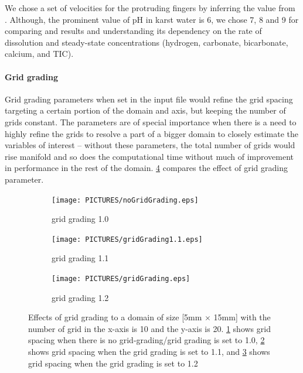We chose a set of velocities for the protruding fingers by inferring the value from \citet{Class2020}. 
Although, the prominent value of pH in karst water is 6, we chose 7, 8 and 9 for comparing \DuMuX and 
\MATLAB results and understanding its dependency on the rate of dissolution and steady-state concentrations 
(hydrogen, carbonate, bicarbonate, calcium, and TIC). \\

\paragraph*{Grid grading}\label{para:definitionGridGrading} \mbox{} Grid grading parameters when set in the input file would refine the grid 
spacing targeting a certain portion of the domain and axis, but keeping the number of grids constant. 
The parameters are of special importance when there is a need to highly refine the grids to resolve a part 
of a bigger domain to closely estimate the variables of interest -- without these parameters, the total number 
of grids would rise manifold and so does the computational time without much of improvement in performance in 
the rest of the domain. \cref{fig:gridGrading} compares the effect of grid grading parameter. \\
\begin{figure}[!h]
        \centering
    \begin{subfigure}{.3\linewidth}
        \centering
        \texttt{[image: PICTURES/noGridGrading.eps]}
        \caption{grid grading 1.0}
        \label{fig:nogg}       %
    \end{subfigure}%
        \hfill
    \begin{subfigure}{.3\linewidth}
        \centering
        \texttt{[image: PICTURES/gridGrading1.1.eps]}
        \caption{grid grading 1.1}
        \label{fig:gg1.1}       %
    \end{subfigure}%
    \hfill
    \begin{subfigure}{.3\linewidth}
        \centering
        \texttt{[image: PICTURES/gridGrading.eps]}
        \caption{grid grading 1.2}
        \label{fig:gg1.2}       %
    \end{subfigure}%
        \hfill
     \caption{Effects of grid grading to a domain of size [5mm $\times$ 15mm] with the number of grid in the x-axis is 
     10 and the y-axis is 20. \cref{fig:nogg} shows grid spacing when there is no grid-grading/grid grading is set to 1.0, 
     \cref{fig:gg1.1} shows grid spacing when the grid grading is set to 1.1, and \cref{fig:gg1.2} shows grid spacing when the grid grading is set to 1.2}
     \label{fig:gridGrading}
\end{figure}

